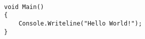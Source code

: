 \begin{listing}[H]
\begin{verbatim}

void Main()
{
    Console.Writeline("Hello World!");
}

\end{verbatim}
\label{code:label}
\end{listing}